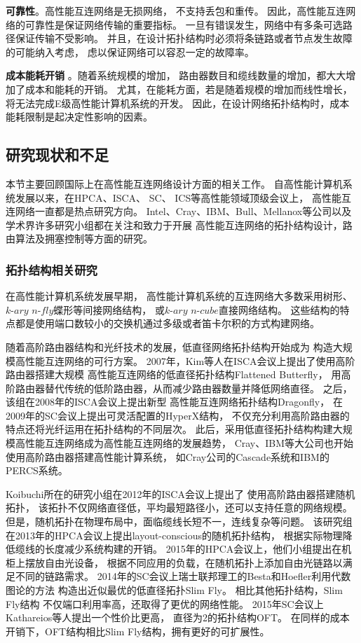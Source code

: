 \textbf{可靠性}。高性能互连网络是无损网络，
不支持丢包和重传。
因此，高性能互连网络的可靠性是保证网络传输的重要指标。
一旦有错误发生，网络中有多条可选路径保证传输不受影响。
并且，在设计拓扑结构时必须将条链路或者节点发生故障的可能纳入考虑，
虑以保证网络可以容忍一定的故障率。

\textbf{成本能耗开销} 。随着系统规模的增加，
路由器数目和缆线数量的增加，都大大增加了成本和能耗的开销。
尤其，在能耗方面，若是随着规模的增加而线性增长，
将无法完成E级高性能计算机系统的开发。
因此，在设计网络拓扑结构时，成本能耗限制是起决定性影响的因素。

\subsection{研究现状和不足}

本节主要回顾国际上在高性能互连网络设计方面的相关工作。
自高性能计算机系统发展以来，在HPCA、ISCA、 SC、 ICS等高性能领域顶级会议上，
高性能互连网络一直都是热点研究方向。
Intel、Cray、IBM、Bull、Mellanox等公司以及
学术界许多研究小组都在关注和致力于开展
高性能互连网络的拓扑结构设计，路由算法及拥塞控制等方面的研究。

\subsubsection{拓扑结构相关研究}
在高性能计算机系统发展早期，
高性能计算机系统的互连网络大多数采用树形、
$k\textrm{-}ary$ $n\textrm{-}fly$蝶形等间接网络结构，
或$k\textrm{-}ary$ $n\textrm{-}cube$直接网络结构。
这些结构的特点都是使用端口数较小的交换机通过多级或者笛卡尔积的方式构建网络。

随着高阶路由器结构和光纤技术的发展，低直径网络拓扑结构开始成为
构造大规模高性能互连网络的可行方案。
2007年，Kim等人在ISCA会议上提出了使用高阶路由器搭建大规模
高性能互连网络的低直径拓扑结构Flattened Butterfly，
用高阶路由器替代传统的低阶路由器，从而减少路由器数量并降低网络直径。
之后，该组在2008年的ISCA会议上提出新型
高性能互连网络拓扑结构Dragonfly，
在2009年的SC会议上提出可灵活配置的HyperX结构，
不仅充分利用高阶路由器的特点还将光纤运用在拓扑结构的不同层次。
此后，采用低直径拓扑结构构建大规模高性能互连网络成为高性能互连网络的发展趋势，
Cray、IBM等大公司也开始使用高阶路由器搭建高性能计算系统，
如Cray公司的Cascade系统和IBM的PERCS系统。

Koibuchi所在的研究小组在2012年的ISCA会议上提出了
使用高阶路由器搭建随机拓扑，
该拓扑不仅网络直径低，平均最短路径小，还可以支持任意的网络规模。
但是，随机拓扑在物理布局中，面临缆线长短不一，连线复杂等问题。
该研究组在2013年的HPCA会议上提出layout-conscious的随机拓扑结构，
根据实际物理降低缆线的长度减少系统构建的开销。
2015年的HPCA会议上，他们小组提出在机柜上摆放自由光设备，
根据不同应用的负载，在随机拓扑上添加自由光链路以满足不同的链路需求。
2014年的SC会议上瑞士联邦理工的Besta和Hoefler利用代数图论的方法
构造出近似最优的低直径拓扑Slim Fly。
相比其他拓扑结构，Slim Fly结构
不仅端口利用率高，还取得了更优的网络性能。
2015年SC会议上Kathareios等人提出一个性价比更高，
直径为2的拓扑结构OFT。
在同样的成本开销下，OFT结构相比Slim Fly结构，拥有更好的可扩展性。

